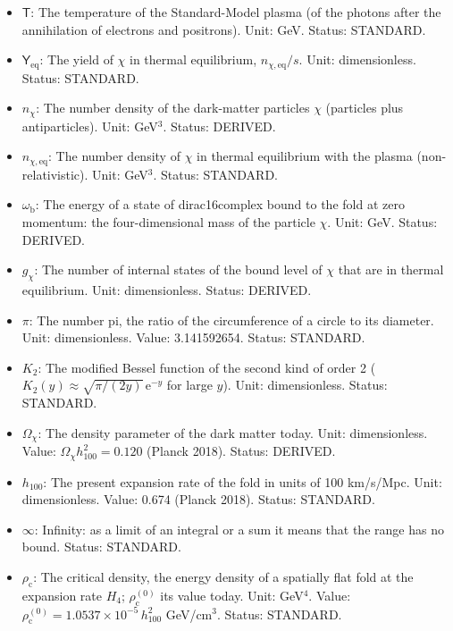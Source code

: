 \documentclass[
  10pt,
]{article}
\begin{document}
\begin{itemize}
  \(g_{\mathrm{s}}\): The effective number of relativistic degrees of
  freedom of the entropy density. Unit: dimensionless. Value: 3.909
  today. Status: STANDARD.
\item
  \(\mathsf{T}\): The temperature of the Standard-Model plasma (of the
  photons after the annihilation of electrons and positrons). Unit: GeV.
  Status: STANDARD.
\item
  \(\mathsf{Y}_{\mathrm{eq}}\): The yield of \(\chi\) in thermal
  equilibrium, \(n_{\chi,\mathrm{eq}}/s\). Unit: dimensionless. Status:
  STANDARD.
\item
  \(n_\chi\): The number density of the dark-matter particles \(\chi\)
  (particles plus antiparticles). Unit: GeV\(^3\). Status: DERIVED.
\item
  \(n_{\chi,\mathrm{eq}}\): The number density of \(\chi\) in thermal
  equilibrium with the plasma (non-relativistic). Unit: GeV\(^3\).
  Status: STANDARD.
\item
  \(\omega_{\mathrm{b}}\): The energy of a state of dirac16complex bound
  to the fold at zero momentum: the four-dimensional mass of the
  particle \(\chi\). Unit: GeV. Status: DERIVED.
\item
  \(g_\chi\): The number of internal states of the bound level of
  \(\chi\) that are in thermal equilibrium. Unit: dimensionless. Status:
  DERIVED.
\item
  \(\pi\): The number pi, the ratio of the circumference of a circle to
  its diameter. Unit: dimensionless. Value: 3.141592654. Status:
  STANDARD.
\item
  \(K_2\): The modified Bessel function of the second kind of order 2
  (\(K_2(y) \approx \sqrt{\pi/(2y)}\,\mathrm{e}^{-y}\) for large \(y\)).
  Unit: dimensionless. Status: STANDARD.
\item
  \(\Omega_\chi\): The density parameter of the dark matter today. Unit:
  dimensionless. Value: \(\Omega_\chi h_{100}^2 = 0.120\) (Planck 2018).
  Status: DERIVED.
\item
  \(h_{100}\): The present expansion rate of the fold in units of 100
  km/s/Mpc. Unit: dimensionless. Value: 0.674 (Planck 2018). Status:
  STANDARD.
\item
  \(\infty\): Infinity: as a limit of an integral or a sum it means that
  the range has no bound. Status: STANDARD.
\item
  \(\rho_{\mathrm{c}}\): The critical density, the energy density of a
  spatially flat fold at the expansion rate \(H_4\);
  \(\rho_{\mathrm{c}}^{(0)}\) its value today. Unit: GeV\(^4\). Value:
  \(\rho_{\mathrm{c}}^{(0)} = 1.0537\times10^{-5}\,h_{100}^2\)
  GeV/cm\(^3\). Status: STANDARD.
\end{itemize}
\end{document}
